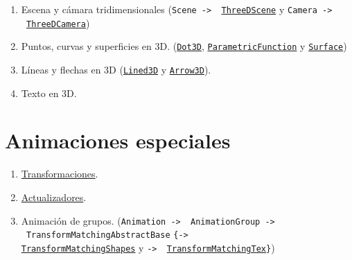 \documentclass[a4paper]{article}
\begin{document}
\begin{enumerate}

    \item Escena y cámara tridimensionales (\texttt{Scene -> \ \href{https://docs.manim.community/en/v0.16.0.post0/reference/manim.scene.three_d_scene.ThreeDScene.html?highlight=ThreeDScene}{ThreeDScene}} y \texttt{Camera -> \ \href{https://docs.manim.community/en/v0.16.0.post0/reference/manim.camera.three_d_camera.ThreeDCamera.html?highlight=ThreeDCamera}{ThreeDCamera}})

    \item Puntos, curvas y superficies en 3D. (\href{https://docs.manim.community/en/v0.16.0.post0/reference/manim.mobject.three_d.three_dimensions.Dot3D.html?highlight=Dot3D}{\texttt{Dot3D}}, \href{https://docs.manim.community/en/v0.16.0.post0/reference/manim.mobject.graphing.functions.ParametricFunction.html?highlight=ParametricFunction#threedparametricspring}{\texttt{ParametricFunction}} y \href{https://docs.manim.community/en/v0.16.0.post0/reference/manim.mobject.three_d.three_dimensions.Surface.html?highlight=Curve3D}{\texttt{Surface}})

    \item Líneas y flechas en 3D (\href{https://docs.manim.community/en/v0.16.0.post0/reference/manim.mobject.three_d.three_dimensions.Line3D.html?highlight=Line3D}{\texttt{Lined3D}} y \href{https://docs.manim.community/en/v0.16.0.post0/reference/manim.mobject.three_d.three_dimensions.Arrow3D.html?highlight=Arrow3D}{\texttt{Arrow3D}}).

    \item Texto en 3D.
\end{enumerate}

\section{Animaciones especiales} \label{Sec: Animaciones especiales}

\begin{enumerate}

    \item \href{https://docs.manim.community/en/v0.16.0.post0/reference/manim.animation.transform.html#module-manim.animation.transform}{Transformaciones}. 

    \item \href{https://docs.manim.community/en/v0.16.0.post0/reference/manim.animation.updaters.html#module-manim.animation.updaters}{Actualizadores}.

    \item Animación de grupos. (\texttt{Animation -> \ AnimationGroup -> \ TransformMatchingAbstractBase} \texttt{\{-> \\ \href{https://docs.manim.community/en/v0.16.0.post0/reference/manim.animation.transform_matching_parts.TransformMatchingShapes.html?highlight=TransformMatchingShapes}{TransformMatchingShapes}} y \texttt{-> \ \href{https://docs.manim.community/en/v0.16.0.post0/reference/manim.animation.transform_matching_parts.TransformMatchingTex.html?highlight=TransformMatchingTex}{TransformMatchingTex}\}})

\end{enumerate}
\end{document}
